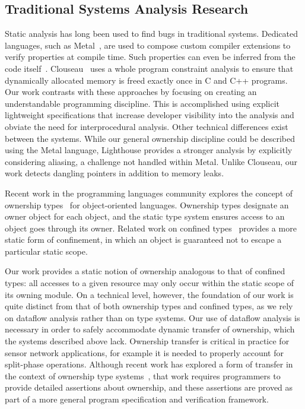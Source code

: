 \subsection{Traditional Systems Analysis Research}



Static analysis has long been used to find bugs in traditional systems.
%
Dedicated languages, such as Metal~\cite{engler00checking}, are used to
compose custom compiler extensions to verify properties at compile time.
%
Such properties can even be inferred from the code
itself~\cite{kremenek06from}.
%
Clouseau~\cite{heine03practical} uses a whole program constraint analysis to
ensure that dynamically allocated memory is freed exactly once in C and C++
programs.
%
Our work contrasts with these approaches by focusing on creating an
understandable programming discipline.
%
This is accomplished using explicit lightweight specifications that increase
developer visibility into the analysis and obviate the need for
interprocedural analysis.
%
Other technical differences exist between the systems.
%
While our general ownership discipline could be described using the Metal
language, Lighthouse provides a stronger analysis by explicitly considering
aliasing, a challenge not handled within Metal.
%
Unlike Clouseau, our work detects dangling pointers in addition to memory
leaks.




Recent work in the programming languages community explores the concept of
ownership types~\cite{ownership,ownership2,BoyapatiEtAl02,aliasjava} for
object-oriented languages. 
%
Ownership types designate an owner object for each object, and the static
type system ensures access to an object goes through its owner.
%
Related work on confined types~\cite{confined1,confined2} provides a more
static form of confinement, in which an object is guaranteed not to escape a
particular static scope.



Our work provides a static notion of ownership analogous to that of confined
types:  all accesses to a given resource may only occur within the static
scope of its owning module.  
%
On a technical level, however, the foundation of our work is quite distinct
from that of both ownership types and confined types, as we rely on dataflow
analysis rather than on type systems.  
%
Our use of dataflow analysis is necessary in order to safely accommodate
dynamic transfer of ownership, which the systems described above lack.  
%
Ownership transfer is critical in practice for sensor network applications,
for example it is needed to properly account for split-phase operations.  
%
Although recent work has explored a form of transfer in the context of
ownership type systems~\cite{DBLP:conf/ecoop/BanerjeeN05}, that work
requires programmers to provide detailed assertions about ownership, and
these assertions are proved as part of a more general program specification
and verification framework.



